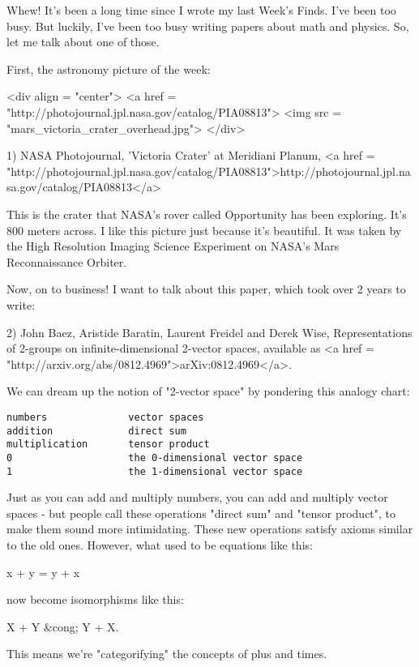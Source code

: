 


Whew!  It's been a long time since I wrote my last Week's Finds.
I've been too busy.  But luckily, I've been too busy writing papers 
about math and physics.  So, let me talk about one of those.  

First, the astronomy picture of the week:

<div align = "center">
<a href = "http://photojournal.jpl.nasa.gov/catalog/PIA08813">
<img src = "mars_victoria_crater_overhead.jpg">
</div>

1) NASA Photojournal, 'Victoria Crater' at Meridiani Planum,
<a href = "http://photojournal.jpl.nasa.gov/catalog/PIA08813">http://photojournal.jpl.nasa.gov/catalog/PIA08813</a>

This is the crater that NASA's rover called Opportunity has been
exploring.  It's 800 meters across.  I like this picture just 
because it's beautiful.  It was taken by the High Resolution 
Imaging Science Experiment on NASA's Mars Reconnaissance Orbiter. 

Now, on to business!  I want to talk about this paper, which
took over 2 years to write:

2) John Baez, Aristide Baratin, Laurent Freidel and Derek Wise,
Representations of 2-groups on infinite-dimensional 2-vector spaces,
available as <a href = "http://arxiv.org/abs/0812.4969">arXiv:0812.4969</a>.

We can dream up the notion of "2-vector space" by pondering
this analogy chart:

\begin{verbatim}
numbers              vector spaces
addition             direct sum
multiplication       tensor product       
0                    the 0-dimensional vector space
1                    the 1-dimensional vector space
\end{verbatim}
    

Just as you can add and multiply numbers, you can add and multiply
vector spaces - but people call these operations "direct sum" and
"tensor product", to make them sound more intimidating.  These new
operations satisfy axioms similar to the old ones.  However, what 
used to be equations like this:

x + y = y + x

now become isomorphisms like this:

X + Y &cong; Y + X.

This means we're "categorifying" the concepts of plus and times.

